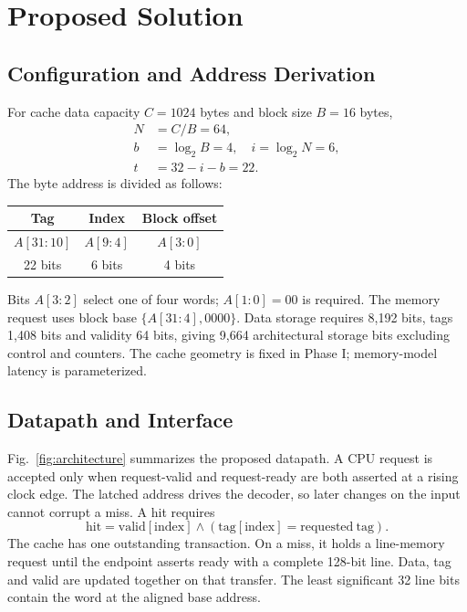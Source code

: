 \documentclass[conference]{IEEEtran}
\begin{document}
\section{Proposed Solution}
\subsection{Configuration and Address Derivation}
For cache data capacity $C=1024$ bytes and block size $B=16$ bytes,
\begin{align}
N &= C/B = 64,\\
b &= \log_2 B = 4,\quad i=\log_2 N=6,\\
t &= 32-i-b = 22.
\end{align}
The byte address is divided as follows:
\begin{center}
\begin{tabular}{ccc}
\toprule
Tag & Index & Block offset\\
\midrule
$A[31:10]$ & $A[9:4]$ & $A[3:0]$\\
22 bits & 6 bits & 4 bits\\
\bottomrule
\end{tabular}
\end{center}
Bits $A[3:2]$ select one of four words; $A[1:0]=00$ is required.
The memory request uses block base $\{A[31:4],0000\}$.
Data storage requires 8,192 bits, tags 1,408 bits and validity 64 bits,
giving 9,664 architectural storage bits excluding control and counters.
The cache geometry is fixed in Phase I; memory-model latency is parameterized.

\subsection{Datapath and Interface}
Fig.~\ref{fig:architecture} summarizes the proposed datapath. A CPU request
is accepted only when request-valid and request-ready are both asserted at
a rising clock edge. The latched address drives the decoder, so later changes
on the input cannot corrupt a miss. A hit requires
\begin{equation}
\mathrm{hit} = \mathrm{valid}[\mathrm{index}]\land
(\mathrm{tag}[\mathrm{index}]=\mathrm{requested\ tag}).
\end{equation}
The cache has one outstanding transaction. On a miss, it holds a line-memory
request until the endpoint asserts ready with a complete 128-bit line. Data,
tag and valid are updated together on that transfer. The least significant
32 line bits contain the word at the aligned base address.
\end{document}

